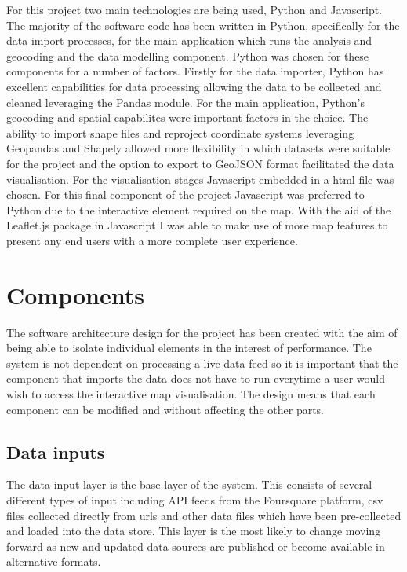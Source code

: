 For this project two main technologies are being used, Python and Javascript. The majority of the software code has been written in Python, specifically for the data import processes, for the main application which runs the analysis and geocoding and the data modelling component. Python was chosen for these components for a number of factors. Firstly for the data importer, Python has excellent capabilities for data processing allowing the data to be collected and cleaned leveraging the Pandas module. For the main application, Python's geocoding and spatial capabilites were important factors in the choice. The ability to import shape files and reproject coordinate systems leveraging Geopandas and Shapely allowed more flexibility in which datasets were suitable for the project and the option to export to GeoJSON format facilitated the data visualisation.
For the visualisation stages Javascript embedded in a html file was chosen. For this final component of the project Javascript was preferred to Python due to the interactive element required on the map. With the aid of the Leaflet.js package in Javascript I was able to make use of more map features to present any end users with a more complete user experience.



\section{Components}

The software architecture design for the project has been created with the aim of being able to isolate individual elements in the interest of performance. The system is not dependent on processing a live data feed so it is important that the component that imports the data does not have to run everytime a user would wish to access the interactive map visualisation. The design means that each component can be modified and without affecting the other parts.  


\subsection{Data inputs}
The data input layer is the base layer of the system. This consists of several different types of input including API feeds from the Foursquare platform, csv files collected directly from urls and other data files which have been pre-collected and loaded into the data store. This layer is the most likely to change moving forward as new and updated data sources are published or become available in alternative formats.

